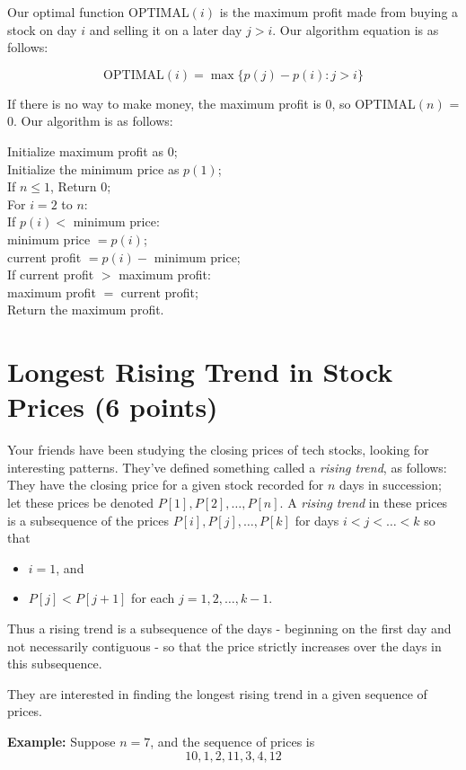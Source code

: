 \documentclass[letter,11pt]{article}
\begin{document}
Our optimal function OPTIMAL$(i)$ is the maximum profit made from buying a stock on day $i$ and selling it on a later day $j > i$. Our algorithm equation is as follows:

\[\text{OPTIMAL}(i) = \max \{ p(j) - p(i) : j > i \}\]

If there is no way to make money, the maximum profit is 0, so OPTIMAL$(n)$ = 0. Our algorithm is as follows:

\noindent Initialize maximum profit as $0$;\\
Initialize the minimum price as $p(1)$;\\
If $n \leq 1$, Return $0$;\\
For $i = 2$ to $n$:\\
\indent If $p(i) <$ minimum price:\\
\indent \indent minimum price $= p(i)$;\\
\indent current profit $= p(i) -$ minimum price;\\
\indent If current profit $>$ maximum profit:\\
\indent \indent maximum profit $=$ current profit;\\
Return the maximum profit.\\


\section{Longest Rising Trend in Stock Prices (6 points)}
Your friends have been studying the closing prices of tech stocks, looking for interesting patterns. They've defined something called a \textit{rising trend}, as follows:
They have the closing price for a given stock recorded for $n$ days in succession; let these prices be denoted $P[1], P[2], \ldots , P[n]$. A \textit{rising trend} in these prices is a subsequence of the prices $P[i], P[j], \ldots, P[k]$ for days $i < j < \ldots < k$ so that
\begin{itemize}
    \item $i = 1$, and
    \item $P[j] < P[j+1]$ for each $j = 1,2, \ldots, k-1$.
\end{itemize}
Thus a rising trend is a subsequence of the days - beginning on the first day and not necessarily contiguous - so that the price strictly increases over the days in this subsequence.

They are interested in finding the longest rising trend in a given sequence of prices.

\textbf{Example:} Suppose $n=7$, and the sequence of prices is
\[10, 1, 2, 11, 3, 4, 12\]
\end{document}
